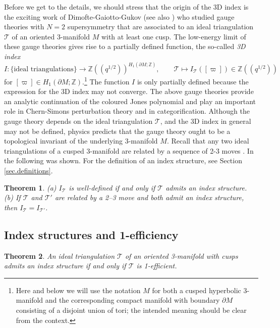 \documentclass[12pt]{amsart}
\newtheorem{thm}{Theorem}[section]
\theoremstyle{definition}
\theoremstyle{remark}
\def\BZ{\mathbb Z}
\def\longto{\longrightarrow}
\def\pt{\partial}
\def\lbl{\label}
\newcommand{\CT}{\mathcal{T}}
\def\be{  \begin{equation} }
\def\ee{  \end{equation} }
\def\bd{\partial}
\begin{document}
Before we get to the details, we should stress that the origin
of the 3D index is the exciting work of Dimofte-Gaiotto-Gukov 
\cite{DGG1,DGG2} (see also \cite{holo-blocks})
who studied gauge theories with $N=2$ supersymmetry that are 
associated to an ideal triangulation $\CT$ of an oriented 3-manifold $M$ 
with at least one cusp. The low-energy limit of these gauge theories gives
rise to a partially defined function, the so-called {\em 3D index}
\be
\lbl{eq.ICT}
I: \{\text{ideal triangulations}\}
\longto \BZ((q^{1/2}))^{H_1(\pt M;\BZ)}, \qquad \CT \mapsto 
I_{\CT}([\varpi]) \in \BZ((q^{1/2}))
\ee
for $[\varpi] \in H_1(\pt M;\BZ)$.\footnote{Here and below we will  
use the notation $M$ for both a cusped hyperbolic 3-manifold 
and the corresponding compact manifold with boundary $\bd M$ consisting of a disjoint union of tori; 
the intended meaning should be clear from the context.}
The function $I$ is only partially defined because the expression for the 3D index may not converge.
The above gauge theories provide an analytic
continuation of the coloured Jones polynomial and play an important role
in Chern-Simons perturbation theory and in categorification.
Although the gauge theory depends on the ideal triangulation $\CT$, 
and the 3D index in general may not be defined, physics predicts that the 
gauge theory ought to be a topological invariant of the 
underlying 3-manifold $M$. Recall that any two ideal triangulations 
of a cusped 3-manifold are related by a sequence of 2-3 moves 
\cite{Ma1,Ma2,Pi}. In \cite{Ga:index} the following was shown.
For the definition of an index structure, see Section \ref{sec.definitions}.

\begin{thm}
\lbl{thm.00}
\rm{(a)}
$I_{\CT}$ is well-defined if and only if $\CT$ admits an {\em index structure}.
\newline
\rm{(b)} If $\CT$ and $\CT'$ are related by a 2--3 move and both admit an
index structure, then $I_{\CT}=I_{\CT'}$.
\end{thm}

\subsection{Index structures and 1-efficiency}
\lbl{sub.1eff}

\begin{thm}
\lbl{index_structure_iff_1-efficient}
An ideal triangulation $\CT$ of an oriented 3-manifold with cusps admits 
an index structure if and only if $\CT$ is 1-efficient.
\end{thm}
\end{document}
